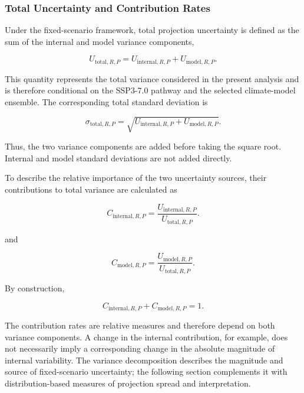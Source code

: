 \documentclass[
]{krantz}
\begin{document}
\subsubsection{Total Uncertainty and Contribution Rates}\label{total-uncertainty-and-contribution-rates}

Under the fixed-scenario framework, total projection uncertainty is defined as the sum of the internal and model variance components,

\begin{equation}
U_{\mathrm{total},R,P}
=
U_{\mathrm{internal},R,P}
+
U_{\mathrm{model},R,P}.
\label{eq:unc-total-variance}
\end{equation}

This quantity represents the total variance considered in the present analysis and is therefore conditional on the SSP3-7.0 pathway and the selected climate-model ensemble. The corresponding total standard deviation is

\begin{equation}
\sigma_{\mathrm{total},R,P}
=
\sqrt{
U_{\mathrm{internal},R,P}
+
U_{\mathrm{model},R,P}
}.
\label{eq:unc-total-standard-deviation}
\end{equation}

Thus, the two variance components are added before taking the square root. Internal and model standard deviations are not added directly.

To describe the relative importance of the two uncertainty sources, their contributions to total variance are calculated as

\begin{equation}
C_{\mathrm{internal},R,P}
=
\frac{
U_{\mathrm{internal},R,P}
}{
U_{\mathrm{total},R,P}
}.
\label{eq:unc-internal-contribution}
\end{equation}

and

\begin{equation}
C_{\mathrm{model},R,P}
=
\frac{
U_{\mathrm{model},R,P}
}{
U_{\mathrm{total},R,P}
}.
\label{eq:unc-model-contribution}
\end{equation}

By construction,

\[
C_{\mathrm{internal},R,P}
+
C_{\mathrm{model},R,P}
=
1.
\]

The contribution rates are relative measures and therefore depend on both variance components. A change in the internal contribution, for example, does not necessarily imply a corresponding change in the absolute magnitude of internal variability. The variance decomposition describes the magnitude and source of fixed-scenario uncertainty; the following section complements it with distribution-based measures of projection spread and interpretation.
\end{document}
